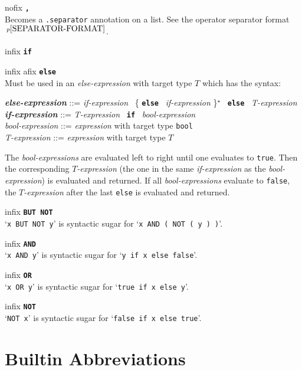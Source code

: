 \documentclass[12pt]{article}
\newcommand{\TT}[1]{{\tt \bfseries #1}}
\newcommand{\STAR}{{\Large $^\star$}}
\newcommand{\ttkey}[1]{{\tt \bfseries #1}}
\newcommand{\emkey}[1]{{\em \bfseries #1}}
\newcommand{\pagnote}[1]{$\,^{p\pageref{#1}}$}
\newenvironment{indpar}[1][0.3in]%
	{\begin{list}{}%
		     {\setlength{\itemsep}{0in}%
		      \setlength{\topsep}{0in}%
		      \setlength{\parsep}{1ex}%
		      \setlength{\labelwidth}{#1}%
		      \setlength{\leftmargin}{#1}%
		      \addtolength{\leftmargin}{\labelsep}}%
	 \item}%
	{\end{list}}
\newenvironment{itemlist}[1][1.2in]%
	{\begin{list}{}{\setlength{\labelwidth}{#1}%
		        \setlength{\leftmargin}{\labelwidth}%
		        \addtolength{\leftmargin}{+0.2in}%
		        \renewcommand{\makelabel}[1]{##1\hfill}}}%
	{\end{list}}
\begin{document}
\begin{itemlist}[0.2in]
\item[nofix \TT{,}] ~\\
Becomes a {\tt .separator} annotation on a list.  See
the operator separator format\pagnote{SEPARATOR-FORMAT}.

\item[infix \TT{if}]
\item[infix afix \TT{else}] \vspace*{-0.15in} ~\\
Must be used in an {\em else-expression} with target
type $T$ which has the syntax:
\begin{indpar}[0.2in]
\emkey{else-expression} ::=
    {\em if-expression}~ \{ \ttkey{else}~ {\em if-expression} \}\STAR{}~
    \ttkey{else}~ {\em T-expression} 
\\[0.5ex]
\emkey{if-expression} ::=
    {\em T-expression}~ \ttkey{if}~ {\em bool-expression}
\\[0.5ex]
{\em bool-expression} ::= {\em expression} with target type {\tt bool}
\\[0.5ex]
{\em T-expression} ::= {\em expression} with target type $T$
\end{indpar}
The {\em bool-expressions} are evaluated left to right until one
evaluates to {\tt true}.  Then the corresponding {\em $T$-expression}
(the one in the same {\em if-expression} as the {\em bool-expression})
is evaluated and returned.  If all {\em bool-expressions} evaluate to
{\tt false}, the {\em $T$-expression} after the last {\tt else}
is evaluated and returned.

\item[infix \TT{BUT NOT}] ~\\
`{\tt x BUT NOT y}' is syntactic sugar for `{\tt x AND ( NOT ( y ) )}'.

\item[infix \TT{AND}] ~\\
`{\tt x AND y}' is syntactic sugar for `{\tt y if x else false}'.

\item[infix \TT{OR}] ~\\
`{\tt x OR y}' is syntactic sugar for `{\tt true if x else y}'.

\item[infix \TT{NOT}] ~\\
`{\tt NOT x}' is syntactic sugar for `{\tt false if x else true}'.

\end{itemlist}

\section{Builtin Abbreviations}
\end{document}
